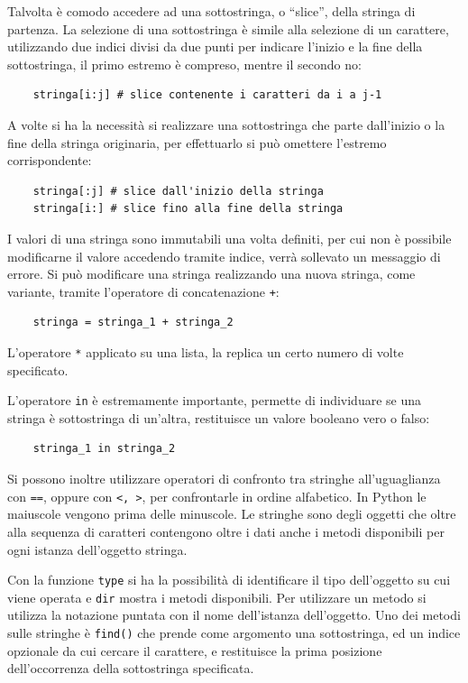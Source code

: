 \documentclass{article}
\numberwithin{equation}{subsection}
\begin{document}
Talvolta è comodo accedere ad una sottostringa, o ``slice'', della stringa di partenza. La selezione di una sottostringa è simile alla selezione di un carattere, 
utilizzando due indici divisi da due punti per indicare l'inizio e la fine della sottostringa, il primo estremo è compreso, mentre il secondo no:
\begin{verbatim}
    stringa[i:j] # slice contenente i caratteri da i a j-1
\end{verbatim}

A volte si ha la necessità si realizzare una sottostringa che parte dall'inizio o la fine della stringa originaria, per effettuarlo si può omettere l'estremo 
corrispondente:
\begin{verbatim}
    stringa[:j] # slice dall'inizio della stringa
    stringa[i:] # slice fino alla fine della stringa
\end{verbatim}

I valori di una stringa sono immutabili una volta definiti, per cui non è possibile modificarne il valore accedendo tramite indice, verrà sollevato un messaggio di errore. 
Si può modificare una stringa realizzando una nuova stringa, come variante, tramite l'operatore di concatenazione \verb|+|:
\begin{verbatim}
    stringa = stringa_1 + stringa_2 
\end{verbatim}

L'operatore \verb|*| applicato su una lista, la replica un certo numero di volte specificato. 

L'operatore \verb|in| è estremamente importante, permette di individuare se una stringa è sottostringa di un'altra, restituisce un valore booleano vero o falso:
\begin{verbatim}
    stringa_1 in stringa_2
\end{verbatim}

Si possono inoltre utilizzare operatori di confronto tra stringhe all'uguaglianza con \verb|==|, oppure con \verb|<, >|, per confrontarle in ordine alfabetico. 
In Python le maiuscole vengono prima delle minuscole. 
Le stringhe sono degli oggetti che oltre alla sequenza di caratteri contengono oltre i dati anche i metodi disponibili per ogni istanza dell'oggetto stringa. 

Con la funzione \verb|type| si ha la possibilità di identificare il tipo dell'oggetto su cui viene operata e \verb|dir| mostra i metodi disponibili. 
Per utilizzare un metodo si utilizza la notazione puntata con il nome dell'istanza dell'oggetto. 
Uno dei metodi sulle stringhe è \verb|find()| che prende come argomento una sottostringa, ed un indice opzionale da cui cercare il carattere, e restituisce la prima 
posizione dell'occorrenza della sottostringa specificata. 
\end{document}
